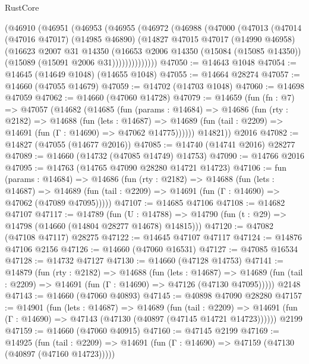 \begin{lexlean}{RustCore}
\begin{coremodule}
    (@46910
      (@46951
        (@46953
          (@46955
            (@46972
              (@46988
                (@47000
                  (@47013
                    (@47014
                      (@47016 @47017)
                      (@14985 @46890)
                      (@14827
                        @47015
                        @47017
                        (@14990 @46958)
                        (@16623
                          @2007
                          @31
                          @14350
                          (@16653
                            @2006
                            @14350
                            (@15084 (@15085 @14350))
                            (@15089 (@15091 @2006 @31))))))))))))))
@47050 := @14643 @1048
@47054 := @14645 (@14649 @1048) (@14655 @1048)
@47055 := @14664 @28274
@47057 := @14660 (@47055 @14679)
@47059 := @14702 (@14703 @1048)
@47060 := @14698 @47059
@47062 := @14660 (@47060 @14728)
@47079 := @14659
    (fun (fn : @7) =>
    @47057
      (@14682
        (@14685
          (fun (params : @14684) =>
          @14686
            (fun (rty : @2182) =>
            @14688
              (fun (lets : @14687) =>
              @14689 (fun (tail : @2209) => @14691 (fun (Γ : @14690) => @47062 @14775))))))
        @14821))
    @2016
@47082 := @14827 (@47055 (@14677 @2016))
@47085 := @14740 (@14741 @2016) @28277
@47089 := @14660 (@14732 (@47085 @14749) @14753)
@47090 := @14766 @2016
@47095 := @14763 (@14765 @47090 @28280 @14721 @14723)
@47106 := fun (params : @14684) =>
  @14686
    (fun (rty : @2182) =>
    @14688
      (fun (lets : @14687) =>
      @14689 (fun (tail : @2209) => @14691 (fun (Γ : @14690) => @47062 (@47089 @47095)))))
@47107 := @14685 @47106
@47108 := @14682 @47107
@47117 := @14789
    (fun (U : @14788) => @14790 (fun (t : @29) => @14798 (@14660 (@14804 @28277 @14678) @14815)))
@47120 := @47082 (@47108 @47117) @28275
@47122 := @14645 @47107 @47117
@47124 := @14876 @47106 @2156
@47126 := @14660 (@47060 @16531)
@47127 := @47085 @16534
@47128 := @14732 @47127
@47130 := @14660 (@47128 @14753)
@47141 := @14879
    (fun (rty : @2182) =>
    @14688
      (fun (lets : @14687) =>
      @14689 (fun (tail : @2209) => @14691 (fun (Γ : @14690) => @47126 (@47130 @47095)))))
    @2148
@47143 := @14660 (@47060 @40893)
@47145 := @40898 @47090 @28280
@47157 := @14901
    (fun (lets : @14687) =>
    @14689
      (fun (tail : @2209) =>
      @14691 (fun (Γ : @14690) => @47143 (@47130 (@40897 (@47145 @14721 @14723))))))
    @2199
@47159 := @14660 (@47060 @40915)
@47160 := @47145 @2199
@47169 := @14925
    (fun (tail : @2209) => @14691 (fun (Γ : @14690) => @47159 (@47130 (@40897 (@47160 @14723)))))

\end{coremodule}
\end{lexlean}
